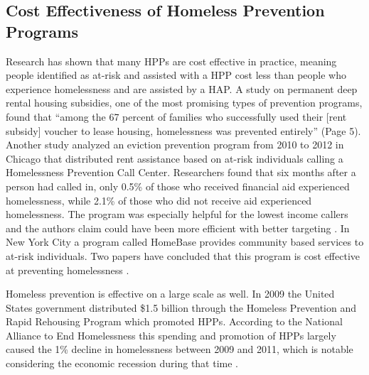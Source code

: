 \documentclass[utf8]{frontiersFPHY} %
\begin{document}
\subsection*{Cost Effectiveness of Homeless Prevention Programs}
Research has shown that many HPPs are cost effective in practice, meaning people identified as at-risk and assisted with a HPP cost less than people who experience homelessness and are assisted by a HAP. A study on permanent deep rental housing subsidies, one of the most promising types of prevention programs, found that ``among the 67 percent of families who successfully used their [rent subsidy] voucher to lease housing, homelessness was prevented entirely'' \cite{shinn2019homelessness} (Page 5). Another study analyzed an eviction prevention program from 2010 to 2012 in Chicago that distributed rent assistance based on at-risk individuals calling a Homelessness Prevention Call Center. Researchers found that six months after a person had called in, only 0.5\% of those who received financial aid experienced homelessness, while 2.1\% of those who did not receive aid experienced homelessness. The program was especially helpful for the lowest income callers and the authors claim could have been more efficient with better targeting \cite{evans2016impact}. In New York City a program called HomeBase provides community based services to at-risk individuals. Two papers have concluded that this program is cost effective at preventing homelessness \cite{rolston2013evaluation} \cite{goodman2016homelessness}. 

Homeless prevention is effective on a large scale as well. In 2009 the United States government distributed \$1.5 billion through the Homeless Prevention and Rapid Rehousing Program which promoted HPPs. According to the National Alliance to End Homelessness this spending and promotion of HPPs largely caused the 1\% decline in homelessness between 2009 and 2011, which is notable considering the economic recession during that time \cite{shinn2013efficient}.
\end{document}
